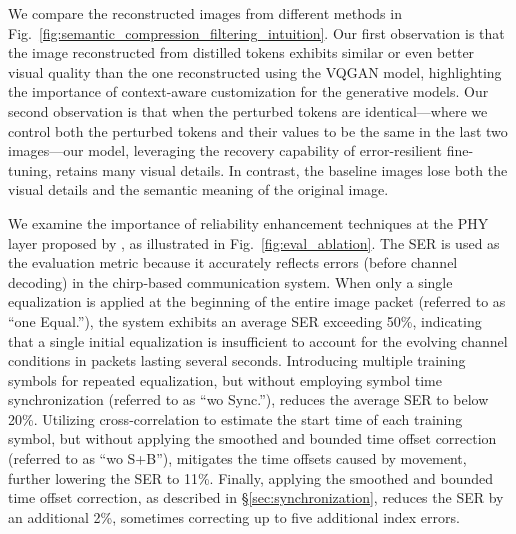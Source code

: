  We compare the reconstructed images from different methods in Fig.~\ref{fig:semantic_compression_filtering_intuition}.
Our first observation is that the image reconstructed from distilled tokens exhibits similar or even better visual quality than the one reconstructed using the VQGAN model, highlighting the importance of context-aware customization for the generative models.
Our second observation is that when the perturbed tokens are identical—where we control both the perturbed tokens and their values to be the same in the last two images—our model, leveraging the recovery capability of error-resilient fine-tuning, retains many visual details. In contrast, the baseline images lose both the visual details and the semantic meaning of the original image.





















We examine the importance of reliability enhancement techniques at the PHY layer proposed by \sysname, as illustrated in Fig.~\ref{fig:eval_ablation}. The SER is used as the evaluation metric because it accurately reflects errors (before channel decoding) in the chirp-based communication system. When only a single equalization is applied at the beginning of the entire image packet (referred to as ``one Equal.''), the system exhibits an average SER exceeding 50\%, indicating that a single initial equalization is insufficient to account for the evolving channel conditions in packets lasting several seconds. Introducing multiple training symbols for repeated equalization, but without employing symbol time synchronization (referred to as ``wo Sync.''), reduces the average SER to below 20\%. Utilizing cross-correlation to estimate the start time of each training symbol, but without applying the smoothed and bounded time offset correction (referred to as ``wo S+B''), mitigates the time offsets caused by movement, further lowering the SER to 11\%. Finally, applying the smoothed and bounded time offset correction, as described in \S\ref{sec:synchronization}, reduces the SER by an additional 2\%, sometimes correcting up to five additional index errors.






